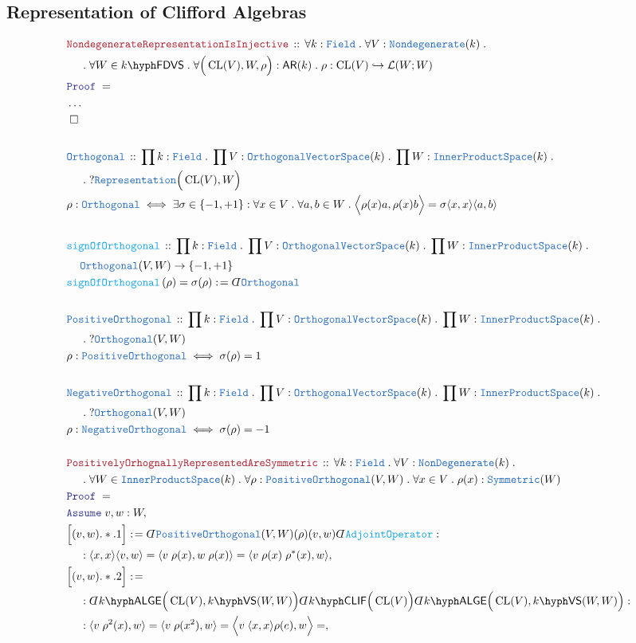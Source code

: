 \documentclass[12pt]{scrartcl}%
\newcommand{\TYPE}[1]{\textcolor{NavyBlue}{\mathtt{#1}}}%
\newcommand{\FUNC}[1]{\textcolor{Cerulean}{\mathtt{#1}}}%
\newcommand{\LOGIC}[1]{\textcolor{Blue}{\mathtt{#1}}}%
\newcommand{\THM}[1]{\textcolor{Maroon}{\mathtt{#1}}}%
\renewcommand{\.}{\; . \;} %
\newcommand{\de}{: \kern 0.1pc =} %
\newcommand{\Act}[1]{\left( #1 \right)} %
\newcommand{\Theorem}[2]{& \THM{#1} \, :: \, #2 \\ & \Proof = \\ } %
\newcommand{\DeclareType}[2]{& \TYPE{#1} \, :: \, #2 \\}%
\newcommand{\DefineType}[3]{& #1 : \TYPE{#2} \iff #3 \\}%
\newcommand{\DeclareFunc}[2]{& \FUNC{#1} \, :: \, #2 \\}%
\newcommand{\DefineNamedFunc}[4]{&  \FUNC{#1}\Act{#2} = #3 \de #4 \\}%
\newcommand{\NewLine}{\\ & \kern 1pc}%
\newcommand{\Page}[1]{ \begin{align*} #1 \end{align*}  }%
\newcommand{ \bd }{ \ByDef }%
\newcommand{\NoProof}{ & \ldots \\ \EndProof}%
\newcommand{\ToInj}{\hookrightarrow} %
\newcommand{\Say}[3]{& #1 \de #2 : #3, \\} %
\newcommand{\Assume}[2]{& \LOGIC{Assume} \; #1 : #2, \\} %
\newcommand{\QED}{\; \square} %
\newcommand{\EndProof}{& \QED \\} %
\newcommand{\ByDef}{\rotatebox[origin=c]{-180}{$D$}}%
\newcommand{\Proof}{\LOGIC{Proof} \; } %
\newcommand{\IPS}{\TYPE{InnerProductSpace}}
\newcommand{\OVS}{\TYPE{OrthogonalVectorSpace}}
\newcommand{\VS}[1]{#1\hyph\mathsf{VS}} %
\newcommand{\FDVS}[1]{#1\hyph\mathsf{FDVS}} %
\renewcommand{\L}{\mathcal{L}}
\newcommand{\Field}{\TYPE{Field}}
\newcommand{\LALGE}[1]{#1\hyph\mathsf{ALGE}}%
\newcommand{\CLIF}[1]{#1\hyph\mathsf{CLIF}}%
\DeclareMathOperator{\CL}{CL}%
\begin{document}
\subsection{Representation of Clifford Algebras}
\Page{
	\Theorem{NondegenerateRepresentationIsInjective}
	{
		\forall k : \Field \.
		\forall V : \TYPE{Nondegenerate}(k) \. \NewLine \. 
		\forall W \in \FDVS{k} \. 
		\forall \Big( \CL(V), W,\rho \Big) : \mathsf{AR}(k) \.
		\rho : \CL(V) \ToInj \L(W;W)
	}
	\NoProof
	\\
	\DeclareType{Orthogonal}
	{
		\prod k : \Field \.
		\prod V : \OVS(k) \.
		\prod W : \IPS(k) \. \NewLine \. 
		? \TYPE{Representation}\Big(\CL(V),W\Big)
	}
	\DefineType{\rho}{Orthogonal}
	{
		\exists \sigma \in  \{-1,+1\} :
		\forall x \in V \. \forall a,b \in W \.
		\Big\langle \rho(x)a, \rho(x)b  \Big\rangle =
		\sigma \langle x, x \rangle\langle a, b \rangle
	}
	\\
	\DeclareFunc{signOfOrthogonal}
	{
		\prod k : \Field \.
		\prod V : \OVS(k) \.
		\prod W : \IPS(k) \.
		\NewLine
		\TYPE{Orthogonal}(V,W)  \to \{-1,+1\}
	}
	\DefineNamedFunc{signOfOrthogonal}
	{\rho}{\sigma(\rho)}{\bd \TYPE{Orthogonal}}
	\\
	\DeclareType{PositiveOrthogonal}
	{
		\prod k : \Field \.
		\prod V : \OVS(k) \.
		\prod W : \IPS(k) \. \NewLine \. 
		? \TYPE{Orthogonal}(V,W)
	}
	\DefineType{\rho}{PositiveOrthogonal}
	{
		\sigma(\rho) = 1
	}
	\\
	\DeclareType{NegativeOrthogonal}
	{
		\prod k : \Field \.
		\prod V : \OVS(k) \.
		\prod W : \IPS(k) \. \NewLine \. 
		? \TYPE{Orthogonal}(V,W)
	}
	\DefineType{\rho}{NegativeOrthogonal}
	{
		\sigma(\rho) = -1
	}
	\\
	\Theorem{PositivelyOrhognallyRepresentedAreSymmetric}
	{
		\forall k : \Field \.
		\forall V : \TYPE{NonDegenerate}(k) \. \NewLine \. 
		\forall W \in \IPS(k) \. 
		\forall \rho : \TYPE{PositiveOrthogonal}(V,W ) \.
		\forall x \in V \.
		\rho(x) : \TYPE{Symmetric}(W)
	}
	\Assume{v,w}{W}
	\Say{\Big[(v,w).*.1\Big]}{\bd \TYPE{PositiveOrthogonal}(V,W)(\rho)(v,w) \bd \FUNC{AdjointOperator} }
	{
		\NewLine : 
		\langle x, x \rangle \langle v, w \rangle  =
		\langle v \; \rho(x) , w \; \rho(x) \rangle = 
		\langle v \; \rho(x) \; \rho^*(x), w \rangle  
	}
	\Say{\Big[(v,w).*.2\Big]}
	{ 
		\NewLine :
		\bd \LALGE{k}
		\Big( \CL(V), \VS{k}(W,W) \Big)  
		\bd \CLIF{k}
		\Big( \CL(V) \Big)
		\bd \LALGE{k}
		\Big( \CL(V), \VS{k}(W,W) \Big)  
	}
	{
		\NewLine :
		\langle v \; \rho^2(x),  w  \rangle = 
		\langle v \; \rho(x^2),  w  \rangle = 
		\Big\langle v  \; \langle x, x \rangle\rho(e), w  \Big\rangle =
}}
\end{document}
